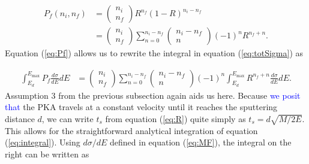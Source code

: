 \documentclass[twoside,twocolumn,9pt]{article}
\begin{document}
\begin{equation}
  \begin{aligned}
    P_f(n_i, n_f)
    &=
    \begin{pmatrix}
      n_i\\n_f
    \end{pmatrix}
    R^{n_f}(1-R)^{n_i - n_f}
    \\&=
    \begin{pmatrix}
      n_i\\n_f
    \end{pmatrix}
    \sum^{n_i-n_f}_{n=0}
    \begin{pmatrix}
      n_i-n_f\\n
    \end{pmatrix}
    (-1)^n R^{n_f+n}.
  \end{aligned}
  \label{eq:Pf}
\end{equation}
%
Equation (\ref{eq:Pf}) allows us to rewrite the integral in equation
(\ref{eq:totSigma}) as

\begin{equation}
  \begin{aligned}
    \int_{E_d}^{E_\text{max}}
    P_f \frac{d\sigma}{dE} dE
    &=
    \begin{pmatrix}
      n_i\\n_f
    \end{pmatrix}
    \sum^{n_i-n_f}_{n=0}
    \begin{pmatrix}
      n_i-n_f\\n
    \end{pmatrix}
    (-1)^n
    \int^{E_\text{max}}_{E_d}
    R^{n_f+n}
    \frac{d\sigma}{dE}
    dE.
  \end{aligned}
  \label{eq:integral}
\end{equation}
%
Assumption 3 from the previous subsection again aids us here.
Because \textcolor{blue}{we posit that} the PKA travels at a constant velocity
until it reaches the sputtering distance $d$, we can write $t_s$ from equation
(\ref{eq:R}) quite simply as $t_s = d\sqrt{M/2E}$.
This allows for the straightforward analytical integration of equation
(\ref{eq:integral}).  Using $d\sigma/dE$ defined in equation (\ref{eq:MF}), the
integral on the right can be written as
\end{document}
